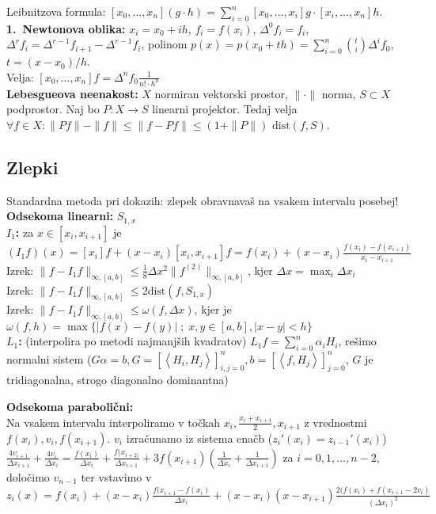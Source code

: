 \documentclass[a4paper,12pt]{article}
\theoremstyle{definition}
\newcommand{\ls}{\left\langle}
\newcommand{\rs}{\right\rangle}
\begin{document}
Leibnitzova formula: $[x_0, \ldots, x_n](g \cdot h) = \sum_{i=0}^n [x_0,
\ldots, x_i]g \cdot [x_i, \ldots, x_n]h$.\\
\textbf{1.\ Newtonova oblika: }$x_i = x_0 + ih$, $f_i = f(x_i)$, $\Delta^0 f_i
= f_i$, $\Delta^r f_i = \Delta^{r-1} f_{i+1} - \Delta^{r-1} f_i$, polinom $p(x)
= p(x_0 + th) = \sum_{i=0}^n \binom{t}{i} \Delta^i f_0$, $t = (x-x_0)/h$.\\
Velja: $[x_0, \ldots, x_n]f = \Delta^n f_0 \frac{1}{n! \cdot h^n}$\\
\textbf{Lebesgueova neenakost:} $X$ normiran vektorski prostor, $\|\cdot\|$
norma, $S \subset X$ podprostor. Naj bo $P \colon X \to S$ linearni projektor.
Tedaj velja  $\forall f \in X\colon \|Pf\| - \|f\| \leq \|f - Pf\| \leq (1 +
\|P\|) \text{ dist} (f, S)$.\\

\subsection*{Zlepki}
Standardna metoda pri dokazih: zlepek obravnavaš na vsakem intervalu posebej!\\
\textbf{Odsekoma linearni: } $S_{1, x}$\\
\textbf{$I_1$: }za $x \in [x_i, x_{i+1}]$ je $(I_1f)(x) = [x_i]f + (x-x_i)
[x_i, x_{i+1}]f = f(x_i) + (x-x_i) \frac{f(x_i) - f(x_{i+1})}{x_i - x_{i+1}}$\\
Izrek: $\|f - I_1f\|_{\infty, [a,b]} \leq \frac{1}{8} \Delta x^2
\|f^{(2)}\|_{\infty, [a,b]}$, kjer $\Delta x = \max_i \Delta x_i$\\
Izrek:  $\|f - I_1f\|_{\infty, [a,b]} \leq 2 \text{dist}(f, S_{1,x})$\\
Izrek:  $\|f - I_1f\|_{\infty, [a,b]} \leq \omega(f, \Delta x)$, kjer je
$\omega(f, h) = \max  \{|f(x) - f(y)|\; ; \; x,y \in [a,b], |x-y| < h\} $\\
\textbf{$L_1$: }(interpolira po metodi najmanjših kvadratov) $L_1 f =
\sum_{i=0}^n \alpha_i H_i$, rešimo normalni sistem ($G \alpha = b, G = [\ls
H_i, H_j\rs]_{i,j= 0}^n, b = [\ls f, H_j \rs]_{j=0}^n$, $G$ je tridiagonalna,
strogo diagonalno dominantna)

\textbf{Odsekoma parabolični:}\\
Na vsakem intervalu interpoliramo v točkah $x_i, \frac{x_i + x_{i+1}}{2},
x_{i+1}$ z vrednostmi $f(x_i), v_i, f(x_{i+1})$. $v_i$ izračunamo iz sistema
enačb ($z_i'(x_i) = z_{i-1}'(x_i)$) $\frac{4 v_{i+1}}{\Delta x_{i+1}} + \frac{4
v_i}{\Delta x_i} = \frac{f(x_i)}{\Delta x_i} + \frac{f(x_{i+2)}}{\Delta
x_{i+1}} + 3 f(x_{i+1})(\frac{1}{\Delta x_i} + \frac{1}{\Delta x_{i+1}})$ za
$i=0,1,\ldots,n-2$, določimo $v_{n-1}$ ter vstavimo v $z_i(x) = f(x_i) +
(x-x_i)\frac{f(x_{i+1} - f(x_i)}{\Delta x_i} + (x-x_i)(x-x_{i+1})
\frac{2(f(x_i) + f(x_{i+1} -2v_i)}{(\Delta x_i)^2}$
\end{document}
